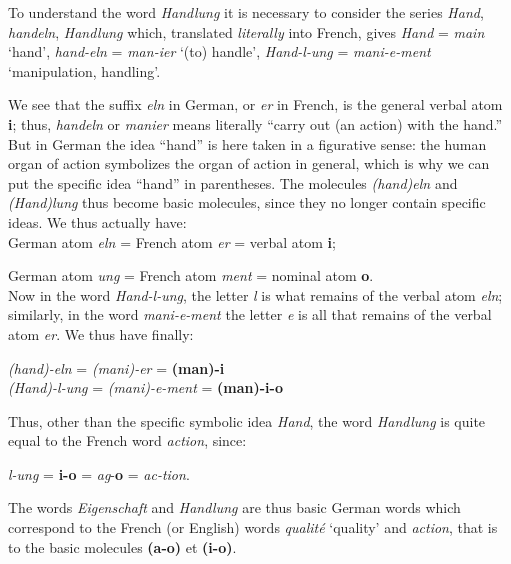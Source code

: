 \begin{sloppypar}
{ }
 { {\small To understand the word \emph{Handlung} it is necessary to
     consider the series \emph{Hand}, \emph{handeln}, \emph{Handlung} which,
     translated \emph{literally} into French, gives \emph{Hand} =
     \emph{main} `hand', \emph{hand-eln} = \emph{man-ier} `(to)
     handle', \emph{Hand-l-ung} = \emph{mani-e-ment} `manipulation,
     handling'.

     We see that the suffix \emph{eln} in German, or \emph{er} in
     French, is the general verbal atom \textbf{i}; thus,
     \emph{handeln} or \emph{manier} means literally ``carry out (an
     action) with the hand.'' But in German the idea ``hand'' is here
     taken in a figurative sense: the human organ of action symbolizes
     the organ of action in general, which is why we can put the
     specific idea ``hand'' in parentheses. The molecules
     \emph{(hand)eln} and \emph{(Hand)lung} thus become basic
     molecules, since they no longer contain specific
     ideas. We thus actually have:\\[1ex]

     German atom \emph{eln} = French atom \emph{er} = verbal atom
     \textbf{i};

     German atom \emph{ung} = French atom \emph{ment} = nominal atom
     \textbf{o}.\\[1ex]

     Now in the word \emph{Hand-l-ung}, the letter \emph{l} is what
     remains of the verbal atom \emph{eln}; similarly, in the word
     \emph{mani-e-ment} the letter \emph{e} is all that remains of the
     verbal atom \emph{er}. We thus have finally:

     \begin{center}
       \emph{(hand)-eln} = \emph{(mani)-er} = \textbf{(man)-i}\\
       \emph{(Hand)-l-ung} = \emph{(mani)-e-ment} = \textbf{(man)-i-o}
     \end{center}

     Thus, other than the specific symbolic idea \emph{Hand}, the word
     \emph{Handlung} is quite equal to the French word \emph{action}, since:

     \begin{center}
       \emph{l-ung} =\textbf{ i-o} = \emph{ag}-\textbf{o} =
       \emph{ac-tion}.
     \end{center}

     The words \emph{Eigenschaft} and \emph{Handlung} are thus basic German
     words which correspond to the French (or English) words
     \emph{qualité} `quality' and \emph{action}, that is to the basic
     molecules \textbf{(a-o)} et \textbf{(i-o)}.}
     
}
\end{sloppypar}
